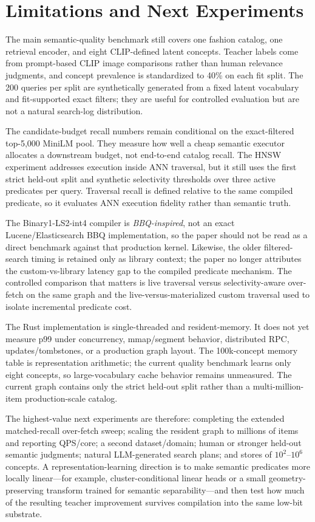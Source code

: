 \section{Limitations and Next Experiments}
The main semantic-quality benchmark still covers one fashion catalog, one retrieval encoder, and eight CLIP-defined latent concepts. Teacher labels come from prompt-based CLIP image comparisons rather than human relevance judgments, and concept prevalence is standardized to 40\% on each fit split. The 200 queries per split are synthetically generated from a fixed latent vocabulary and fit-supported exact filters; they are useful for controlled evaluation but are not a natural search-log distribution.

The candidate-budget recall numbers remain conditional on the exact-filtered top-5,000 MiniLM pool. They measure how well a cheap semantic executor allocates a downstream budget, not end-to-end catalog recall. The HNSW experiment addresses execution inside ANN traversal, but it still uses the first strict held-out split and synthetic selectivity thresholds over three active predicates per query. Traversal recall is defined relative to the same compiled predicate, so it evaluates ANN execution fidelity rather than semantic truth.

The Binary1-LS2-int4 compiler is \emph{BBQ-inspired}, not an exact Lucene/Elasticsearch BBQ implementation, so the paper should not be read as a direct benchmark against that production kernel. Likewise, the older  filtered-search timing is retained only as library context; the paper no longer attributes the custom-vs-library latency gap to the compiled predicate mechanism. The controlled comparison that matters is live traversal versus selectivity-aware over-fetch on the same graph and the live-versus-materialized custom traversal used to isolate incremental predicate cost.

The Rust implementation is single-threaded and resident-memory. It does not yet measure p99 under concurrency, mmap/segment behavior, distributed RPC, updates/tombstones, or a production graph layout. The 100k-concept memory table is representation arithmetic; the current quality benchmark learns only eight concepts, so large-vocabulary cache behavior remains unmeasured. The current graph contains only the strict held-out split rather than a multi-million-item production-scale catalog.

The highest-value next experiments are therefore: completing the extended matched-recall over-fetch sweep; scaling the resident graph to millions of items and reporting QPS/core; a second dataset/domain; human or stronger held-out semantic judgments; natural LLM-generated search plans; and stores of $10^2$--$10^6$ concepts. A representation-learning direction is to make semantic predicates more locally linear---for example, cluster-conditional linear heads or a small geometry-preserving transform trained for semantic separability---and then test how much of the resulting teacher improvement survives compilation into the same low-bit substrate.

